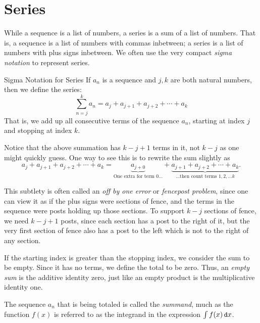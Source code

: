 
\section{Series} While a sequence is a list of numbers, a series is a sum of a list of numbers.  That is, a sequence is a list of numbers with commas inbetween; a series is a list of numbers with plus signs inbetween.  We often use the very compact \emph{sigma notation} to represent series. 

\begin{definition}{Sigma Notation for Series}
If $a_n$ is a sequence and $j,k$ are both natural numbers, then we define the series:
$$\sum_{n=j}^k a_n =a_{j}+a_{j+1}+a_{j+2}+\cdots+a_{k}$$ That is, we add up all consecutive terms of the sequence $a_n$, starting at index $j$ and stopping at index $k$.
\end{definition}
Notice that the above summation has $k-j+1$ terms in it, not $k-j$ as one might quickly guess.  One way to see this is to rewrite the sum slightly as
$$a_{j}+a_{j+1}+a_{j+2}+\cdots+a_{k}=\underset{\text{One extra for term }0\ldots}{\underbrace{a_{j+0}}}+\underset{\text{\ldots then count terms }1,2,\ldots k}{\underbrace{a_{j+1}+a_{j+2}+\cdots+a_{k}}}.$$

This subtlety is often called an \emph{off by one error} or \emph{fencepost problem}, since one can view it as if the plus signs were sections of fence, and the terms in the sequence were posts holding up those sections.  To support $k-j$ sections of fence, we need $k-j+1$ posts, since each section has a post to the right of it, but the very first section of fence also has a post to the left which is not to the right of any section. 

If the starting index is greater than the stopping index, we consider the sum to be empty.  Since it has no terms, we define the total to be zero.  Thus, an \emph{empty sum} is the additive identity zero, just like an empty product is the multiplicative identity one.

The sequence $a_n$ that is being totaled is called the \emph{summand}, much as the function $f(x)$ is referred to as the integrand in the expression $\int f(x) \mathop{}\!\mathtt{d} x$.

